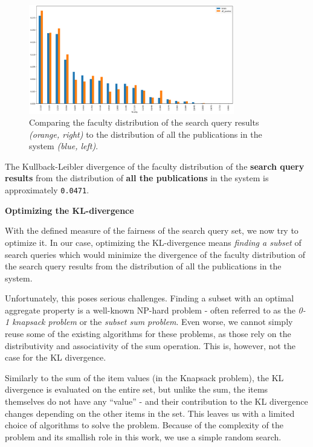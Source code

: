 \begin{figure}[ht!]
    \captionsetup{width=.9\linewidth}
    \includegraphics[width=0.8\textwidth]{../img/all-queries-vs-totals.png}
    \centering
    \caption{Comparing the faculty distribution of the search query results \textit{(orange, right)} to the distribution of all the publications in the system \textit{(blue, left)}.}
\end{figure}

The Kullback-Leibler divergence of the faculty distribution of the \textbf{search query results} from the distribution of \textbf{all the publications} in the system is approximately \texttt{0.0471}.

\textbf{Optimizing the KL-divergence}

With the defined measure of the fairness of the search query set, we now try to optimize it.
In our case, optimizing the KL-divergence means \textit{finding a subset} of search queries which would minimize the divergence of the faculty distribution of the search query results from the distribution of all the publications in the system.

Unfortunately, this poses serious challenges. 
Finding a subset with an optimal aggregate property is a well-known NP-hard problem - often referred to as the \textit{0-1 knapsack problem} or the \textit{subset sum problem}.
Even worse, we cannot simply reuse some of the existing algorithms for these problems, as those rely on the distributivity and associativity of the sum operation. 
This is, however, not the case for the KL divergence.

Similarly to the sum of the item values (in the Knapsack problem), the KL divergence is evaluated on the entire set, but unlike the sum, the items themselves do not have any “value” - and their contribution to the KL divergence changes depending on the other items in the set. 
This leaves us with a limited choice of algorithms to solve the problem. 
Because of the complexity of the problem and its smallish role in this work, we use a simple random search. 

